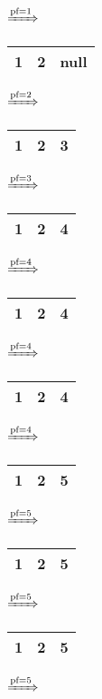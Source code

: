 \documentclass{article}
\begin{document}
\begin{itemize}
\begin{tabular}{|c|c|c|}
                \hline
            \end{tabular}
            $\xRightarrow{\text{pf}=1}$
            \begin{tabular}{|c|c|c|}
                \hline
                1 & 2 & null\\
                \hline
            \end{tabular}
            $\xRightarrow{\text{pf}=2}$
            \begin{tabular}{|c|c|c|}
                \hline
                1 & 2 & 3\\
                \hline
            \end{tabular}
            $\xRightarrow{\text{pf}=3}$
            \begin{tabular}{|c|c|c|}
                \hline
                1 & 2 & 4\\
                \hline
            \end{tabular}
            $\xRightarrow{\text{pf}=4}$
            \begin{tabular}{|c|c|c|}
                \hline
                1 & 2 & 4\\
                \hline
            \end{tabular}
            $\xRightarrow{\text{pf}=4}$
            \begin{tabular}{|c|c|c|}
                \hline
                1 & 2 & 4\\
                \hline
            \end{tabular}
            $\xRightarrow{\text{pf}=4}$
            \begin{tabular}{|c|c|c|}
                \hline
                1 & 2 & 5\\
                \hline
            \end{tabular}
            $\xRightarrow{\text{pf}=5}$
            \begin{tabular}{|c|c|c|}
                \hline
                1 & 2 & 5\\
                \hline
            \end{tabular}
            $\xRightarrow{\text{pf}=5}$
            \begin{tabular}{|c|c|c|}
                \hline
                1 & 2 & 5\\
                \hline
            \end{tabular}
            $\xRightarrow{\text{pf}=5}$
            \begin{tabular}{|c|c|c|}
                \hline

\end{tabular}
\end{itemize}
\end{document}
